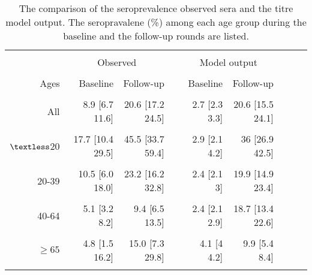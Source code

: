 \documentclass{article}
\begin{document}
\begin{table}[ht]
\begin{minipage}{\textwidth}   
\caption{The comparison of the seroprevalence observed sera and the titre model output. The seropravalene (\%) among each age group during the baseline and the follow-up rounds are listed. } %
\centering %
\begin{tabular*}{13cm}{rrrrrrrrr}

\hline\hline \\%

  &  \multicolumn{2}{c}{Observed}  & &  \multicolumn{2}{c}{Model output} \\
 \cline{2-3}  \cline{5-6} \\
 Ages &  Baseline &       Follow-up &   &     Baseline &      Follow-up   \\
\hline \\ %
 All &     8.9 [6.7 11.6] &    20.6 [17.2  24.5] & &   2.7 [2.3 3.3] &    20.6 [15.5  24.1] \\ \\
 $\textless $20  & 17.7 [10.4 29.5] & 45.5 [33.7 59.4] & & 2.9 [2.1 4.2] & 36 [26.9  42.5] \\ \\

 20-39 &     10.5 [6.0  18.0] &   23.2 [16.2 32.8] & &     2.4 [2.1 3] &   19.9 [14.9 23.4] \\ \\

 40-64 &     5.1    [3.2   8.2] &    9.4 [6.5  13.5] & &   2.4 [2.1 2.9] &    18.7 [13.4 22.6] \\ \\

 $\geq65$ &   4.8  [1.5 16.2] &    15.0 [7.3  29.8] & &    4.1 [4 4.2] &  9.9 [5.4 8.4] \\ \\
\hline %
\end{tabular*}
\end{minipage}
\end{table}

\clearpage
\end{document}
